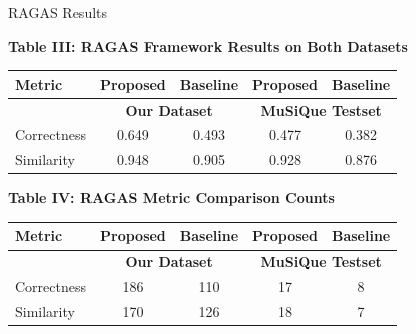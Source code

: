 \documentclass[aspectratio=169,xcolor=dvipsnames]{beamer}
\begin{document}
	\begin{frame}{RAGAS Results}
		
		\scriptsize
		\centering
		
		{\textbf{\textcolor{blue!70}{Table III: RAGAS Framework Results on Both Datasets}}}
		
		\vspace{0.15cm}
		
		\begin{tabular}{|l|c|c|c|c|}
			\hline
			\textbf{\textcolor{purple!80}{Metric}} &
			\textbf{\textcolor{teal!80}{Proposed}} &
			\textbf{\textcolor{gray!80}{Baseline}} &
			\textbf{\textcolor{teal!80}{Proposed}} &
			\textbf{\textcolor{gray!80}{Baseline}} \\
			\hline
			& \multicolumn{2}{c|}{\textbf{\textcolor{blue!60}{Our Dataset}}} &
			\multicolumn{2}{c|}{\textbf{\textcolor{blue!60}{MuSiQue Testset}}} \\
			\hline
			Correctness & \textcolor{teal!80}{0.649} & 0.493 & \textcolor{teal!80}{0.477} & 0.382 \\
			Similarity  & \textcolor{teal!80}{0.948} & 0.905 & \textcolor{teal!80}{0.928} & 0.876 \\
			\hline
		\end{tabular}
		
		\vspace{0.45cm}
		
		{\textbf{\textcolor{blue!70}{Table IV: RAGAS Metric Comparison Counts}}}
		
		\vspace{0.15cm}
		
		\begin{tabular}{|l|c|c|c|c|}
			\hline
			\textbf{\textcolor{purple!80}{Metric}} &
			\textbf{\textcolor{teal!80}{Proposed}} &
			\textbf{\textcolor{gray!80}{Baseline}} &
			\textbf{\textcolor{teal!80}{Proposed}} &
			\textbf{\textcolor{gray!80}{Baseline}} \\
			\hline
			& \multicolumn{2}{c|}{\textbf{\textcolor{blue!60}{Our Dataset}}} &
			\multicolumn{2}{c|}{\textbf{\textcolor{blue!60}{MuSiQue Testset}}} \\
			\hline
			Correctness & \textcolor{teal!80}{186} & 110 & \textcolor{teal!80}{17} & 8 \\
			Similarity  & \textcolor{teal!80}{170} & 126 & \textcolor{teal!80}{18} & 7 \\
			\hline
		\end{tabular}
		
	\end{frame}
	
\end{document}
